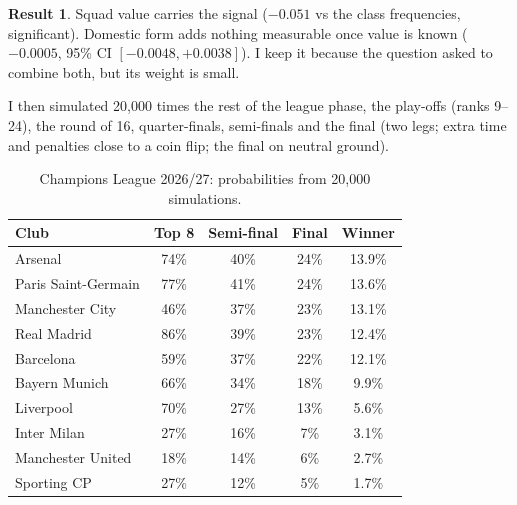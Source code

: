 \documentclass[11pt,a4paper]{article}
\theoremstyle{definition}
\newtheorem{result}{Result}[section]
\theoremstyle{remark}
\begin{document}
\begin{result}
Squad value carries the signal ($-0.051$ vs the class frequencies, significant). Domestic form adds nothing measurable once value is known ($-0.0005$, 95\% CI $[-0.0048,+0.0038]$).
I keep it because the question asked to combine both, but its weight is small.
\end{result}

I then simulated 20{,}000 times the rest of the league phase, the play-offs (ranks 9--24), the round of 16, quarter-finals, semi-finals and the final (two legs; extra time and penalties close to a coin flip; the final on neutral ground).

\begin{table}[H]
\caption{Champions League 2026/27: probabilities from 20{,}000 simulations.}
\begin{center}
\small
\begin{tabular}{lcccc}
\toprule
\textbf{Club} & \textbf{Top 8} & \textbf{Semi-final} & \textbf{Final} & \textbf{Winner} \\
\midrule
Arsenal & 74\% & 40\% & 24\% & 13.9\% \\
Paris Saint-Germain & 77\% & 41\% & 24\% & 13.6\% \\
Manchester City & 46\% & 37\% & 23\% & 13.1\% \\
Real Madrid & 86\% & 39\% & 23\% & 12.4\% \\
Barcelona & 59\% & 37\% & 22\% & 12.1\% \\
Bayern Munich & 66\% & 34\% & 18\% & 9.9\% \\
Liverpool & 70\% & 27\% & 13\% & 5.6\% \\
Inter Milan & 27\% & 16\% & 7\% & 3.1\% \\
Manchester United & 18\% & 14\% & 6\% & 2.7\% \\
Sporting CP & 27\% & 12\% & 5\% & 1.7\% \\
\bottomrule
\end{tabular}
\end{center}
\end{table}
\end{document}

